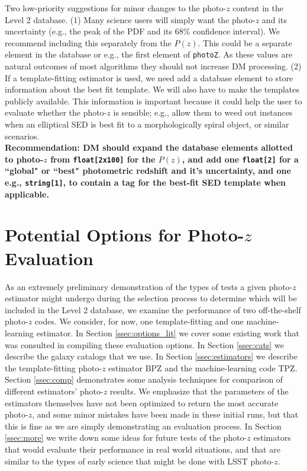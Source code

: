 \documentclass[DM,lsstdraft,toc]{lsstdoc}
\begin{document}
Two low-priority suggestions for minor changes to the photo-$z$ content in the Level 2 database. (1) Many science users will simply want the photo-$z$ and its uncertainty (e.g., the peak of the PDF and its 68\% confidence interval). We recommend including this separately from the $P(z)$. This could be a separate element in the database or e.g., the first element of {\tt photoZ}. As these values are natural outcomes of most algorithms they should not increase DM processing. (2) If a template-fitting estimator is used, we need add a database element to store information about the best fit template. We will also have to make the templates publicly available. This information is important because it could help the user to evaluate whether the photo-$z$ is sensible; e.g., allow them to weed out instances when an elliptical SED is best fit to a morphologically spiral object, or similar scenarios. \\
\textbf{Recommendation: DM should expand the database elements allotted to photo-$z$ from {\tt float[2x100]} for the $P(z)$, and add one {\tt float[2]} for a ``global" or ``best" photometric redshift and it's uncertainty, and one e.g., {\tt string[1]}, to contain a tag for the best-fit SED template when applicable.}



\section{Potential Options for Photo-$z$ Evaluation}\label{sec:options}

As an extremely preliminary demonstration of the types of tests a given photo-$z$ estimator might undergo during the selection process to determine which will be included in the Level 2 database, we examine the performance of two off-the-shelf photo-$z$ codes. We consider, for now, one template-fitting and one machine-learning estimator. In Section \ref{ssec:options_lit} we cover some existing work that was consulted in compiling these evaluation options. In Section \ref{ssec:cats} we describe the galaxy catalogs that we use. In Section \ref{ssec:estimators} we describe the template-fitting photo-$z$ estimator BPZ and the machine-learning code TPZ. Section \ref{ssec:comp} demonstrates some analysis techniques for comparison of different estimators' photo-$z$ results. We emphasize that the parameters of the estimators themselves have not been optimized to return the most accurate photo-$z$, and some minor mistakes have been made in these initial runs, but that this is fine as we are simply demonstrating an evaluation process. In Section \ref{ssec:more} we write down some ideas for future tests of the photo-$z$ estimators that would evaluate their performance in real world situations, and that are similar to the types of early science that might be done with LSST photo-$z$.
\end{document}
